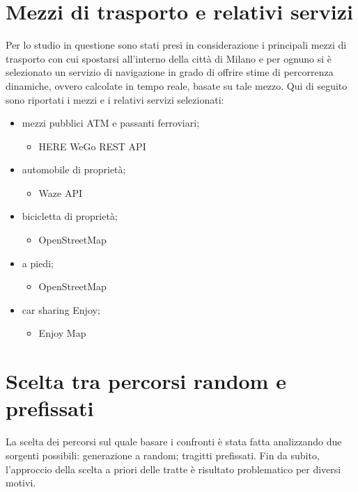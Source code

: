 \section{Mezzi di trasporto e relativi servizi}

Per lo studio in questione sono stati presi in considerazione i principali mezzi di trasporto con cui spostarsi all'interno della città di Milano e per ognuno si è selezionato un servizio di navigazione in grado di offrire stime di percorrenza dinamiche, ovvero calcolate in tempo reale, basate su tale mezzo. Qui di seguito sono riportati i mezzi e i relativi servizi selezionati:

\begin{itemize}
	\item mezzi pubblici ATM e passanti ferroviari;
	\begin{itemize}
		\item HERE WeGo REST API\cite{herewegoapi}
	\end{itemize}
	\item automobile di proprietà;
	\begin{itemize}
		\item Waze API\cite{wazeapi}
	\end{itemize}
	\item bicicletta di proprietà;
	\begin{itemize}
		\item OpenStreetMap\cite{openstreetmap}
	\end{itemize}
	\item a piedi;
	\begin{itemize}
		\item OpenStreetMap\cite{openstreetmap}
	\end{itemize}
	\item car sharing Enjoy;
	\begin{itemize}
		\item Enjoy Map\cite{enjoycarsharing}
	\end{itemize}
\end{itemize}



\section{Scelta tra percorsi random e prefissati}

La scelta dei percorsi sul quale basare i confronti è stata fatta analizzando due sorgenti possibili: generazione a random; tragitti prefissati. Fin da subito, l'approccio della scelta a priori delle tratte è risultato problematico per diversi motivi.

